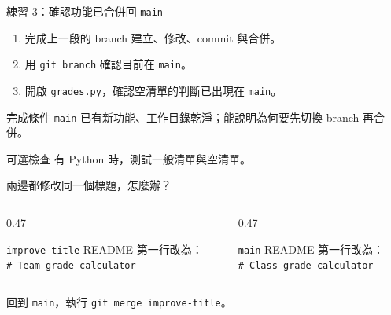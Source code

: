 \documentclass[xetex, unicode, 10pt, aspectratio=169]{beamer}
\begin{document}
\begin{frame}{練習 3：確認功能已合併回 \texttt{main}}
    \begin{enumerate}
        \item 完成上一段的 branch 建立、修改、commit 與合併。
        \item 用 \texttt{git branch} 確認目前在 \texttt{main}。
        \item 開啟 \texttt{grades.py}，確認空清單的判斷已出現在 \texttt{main}。
    \end{enumerate}
    \begin{block}{完成條件}
        \texttt{main} 已有新功能、工作目錄乾淨；能說明為何要先切換 branch 再合併。
    \end{block}
    \begin{block}{可選檢查}
        有 Python 時，測試一般清單與空清單。
    \end{block}
\end{frame}

\begin{frame}{兩邊都修改同一個標題，怎麼辦？}
\begin{center}
    \end{center}
    \begin{columns}[t]
        \begin{column}{0.47\textwidth}
            \begin{block}{\texttt{improve-title}}
                README 第一行改為：\\
                \texttt{\# Team grade calculator}
            \end{block}
        \end{column}
        \begin{column}{0.47\textwidth}
            \begin{block}{\texttt{main}}
                README 第一行改為：\\
                \texttt{\# Class grade calculator}
            \end{block}
        \end{column}
    \end{columns}
    回到 \texttt{main}，執行 \texttt{git merge improve-title}。
    \pause
    \begin{center}\end{center}
\end{frame}
\end{document}
